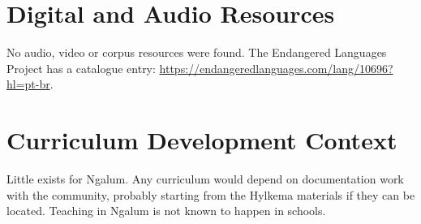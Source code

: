\documentclass[12pt]{article}
\begin{document}
\section{Digital and Audio Resources}
No audio, video or corpus resources were found. The Endangered Languages Project has a catalogue entry: \url{https://endangeredlanguages.com/lang/10696?hl=pt-br}.

\section{Curriculum Development Context}
Little exists for Ngalum. Any curriculum would depend on documentation work with the community, probably starting from the Hylkema materials if they can be located. Teaching in Ngalum is not known to happen in schools.
\end{document}
